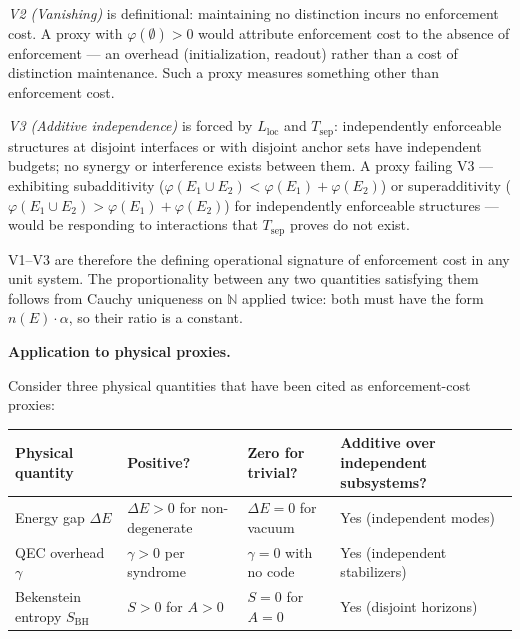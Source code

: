 \documentclass[11pt]{article}
\theoremstyle{remark}
\begin{document}
\smallskip\noindent\textit{V2 (Vanishing)} is definitional: maintaining no distinction incurs no enforcement cost.  A proxy with $\varphi(\emptyset) > 0$ would attribute enforcement cost to the absence of enforcement --- an overhead (initialization, readout) rather than a cost of distinction maintenance.  Such a proxy measures something other than enforcement cost.

\smallskip\noindent\textit{V3 (Additive independence)} is forced by $L_{\mathrm{loc}}$ and $T_{\mathrm{sep}}$: independently enforceable structures at disjoint interfaces or with disjoint anchor sets have independent budgets; no synergy or interference exists between them.  A proxy failing V3 --- exhibiting subadditivity ($\varphi(E_1 \cup E_2) < \varphi(E_1) + \varphi(E_2)$) or superadditivity ($\varphi(E_1 \cup E_2) > \varphi(E_1) + \varphi(E_2)$) for independently enforceable structures --- would be responding to interactions that $T_{\mathrm{sep}}$ proves do not exist.

\smallskip\noindent V1--V3 are therefore the defining operational signature of enforcement cost in any unit system.  The proportionality between any two quantities satisfying them follows from Cauchy uniqueness on $\mathbb{N}$ applied twice: both must have the form $n(E) \cdot \alpha$, so their ratio is a constant.

\medskip\noindent\textbf{Application to physical proxies.}

Consider three physical quantities that have been cited as enforcement-cost proxies:

\smallskip
\begin{center}
\smallskip
\begin{tabular}{@{}p{3.2cm}p{2.6cm}p{2.8cm}p{3.8cm}@{}}
\textbf{Physical quantity} & \textbf{Positive?} & \textbf{Zero for trivial?} & \textbf{Additive over independent subsystems?} \\[2pt]
\hline\noalign{\smallskip}
Energy gap $\Delta E$ & $\Delta E > 0$ for non-degenerate & $\Delta E = 0$ for vacuum & Yes (independent modes) \\[3pt]
QEC overhead $\gamma$ & $\gamma > 0$ per syndrome & $\gamma = 0$ with no code & Yes (independent stabilizers) \\[3pt]
Bekenstein entropy $S_{\mathrm{BH}}$ & $S > 0$ for $A > 0$ & $S = 0$ for $A = 0$ & Yes (disjoint horizons) \\
\end{tabular}
\label{tab:physical_proxies}
\end{center}
\end{document}
